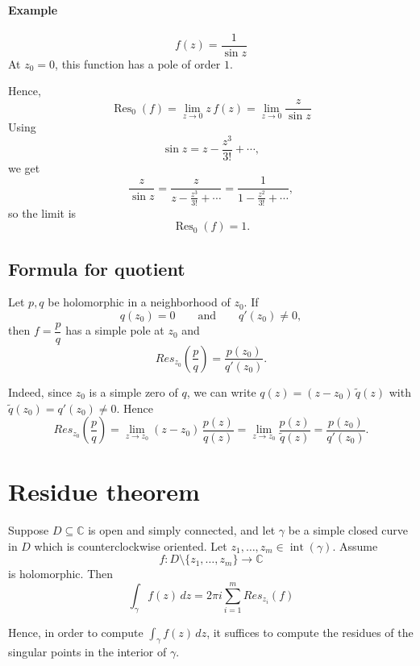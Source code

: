 \paragraph{Example}

\[
f(z)=\frac{1}{\sin z}
\]
At $z_0=0$, this function has a pole of order $1$. 

Hence,
\[
\operatorname{Res}_0(f)
=
\lim_{z\to 0} z\,f(z)
=
\lim_{z\to 0}\frac{z}{\sin z}
\]
Using
\[
\sin z = z - \frac{z^3}{3!}+\cdots,
\]
we get
\[
\frac{z}{\sin z}
=
\frac{z}{z-\frac{z^3}{3!}+\cdots}
=
\frac{1}{1-\frac{z^2}{3!}+\cdots},
\]
so the limit is
\[
\operatorname{Res}_0(f)=1.
\]

\subsection{Formula for quotient}
\begin{corollary}
  Let $p, q$ be holomorphic in a neighborhood of $z_0$. If
  \[
  q(z_0) = 0 \qquad \text{and} \qquad q'(z_0) \neq 0,
  \]
  then $f = \dfrac{p}{q}$ has a simple pole at $z_0$ and
  \[
  Res_{z_0}\!\left(\frac{p}{q}\right) = \frac{p(z_0)}{q'(z_0)}.
  \]
\end{corollary}

\begin{remark}
  Indeed, since $z_0$ is a simple zero of $q$, we can write $q(z) = (z-z_0)\,\tilde{q}(z)$ with $\tilde{q}(z_0) = q'(z_0) \neq 0$. Hence
  \[
  Res_{z_0}\!\left(\frac{p}{q}\right)
  = \lim_{z \to z_0} (z-z_0)\,\frac{p(z)}{q(z)}
  = \lim_{z \to z_0} \frac{p(z)}{\tilde{q}(z)}
  = \frac{p(z_0)}{q'(z_0)}.
  \]
\end{remark}

\section{Residue theorem}

\begin{theorem}
Suppose $D\subseteq \mathbb{C}$ is open and simply connected, and let $\gamma$ be a simple closed curve in $D$ which is counterclockwise oriented. Let $z_1,\dots,z_m\in \operatorname{int}(\gamma)$. Assume
\[
f: D\setminus\{z_1,\dots,z_m\}\to \mathbb{C}
\]
is holomorphic. Then
\[
\int_\gamma f(z)\,dz
=
2\pi i \sum_{i=1}^{m}Res_{z_i}(f) 
\]
\end{theorem}

Hence, in order to compute $\int_\gamma f(z)\,dz$, it suffices to compute the residues of the singular points in the interior of $\gamma$.

